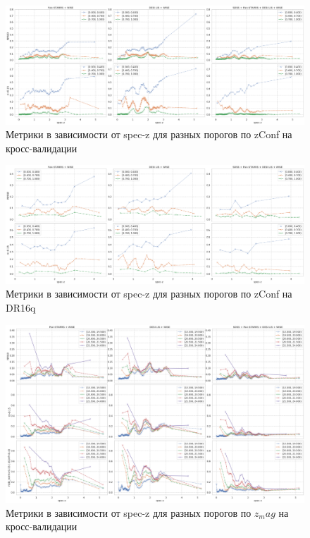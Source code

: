 \documentclass[fleqn,usenatbib]{mnras}
\begin{document}
\begin{landscape}
\begin{figure}
    \centering
    \includegraphics[width=0.9\linewidth]{images/metrics-adv-zspec-x-zconf-cv2.png}
    \caption{Метрики в зависимости от spec-z для разных порогов по zConf на кросс-валидации}
    \label{fig:my_label}
\end{figure}
\end{landscape}


\begin{landscape}
\begin{figure}
    \centering
    \includegraphics[width=0.9\linewidth]{images/metrics-adv-zspec-x-zconf-dr16q.png}
    \caption{Метрики в зависимости от spec-z для разных порогов по zConf на DR16q}
    \label{fig:my_label}
\end{figure}
\end{landscape}


\begin{landscape}
\begin{figure}
    \centering
    \includegraphics[width=0.9\linewidth]{images/metrics-adv-zspec-x-zmag-cv2.png}
    \caption{Метрики в зависимости от spec-z для разных порогов по $z_mag$ на кросс-валидации}
    \label{fig:my_label}
\end{figure}
\end{landscape}
\end{document}
